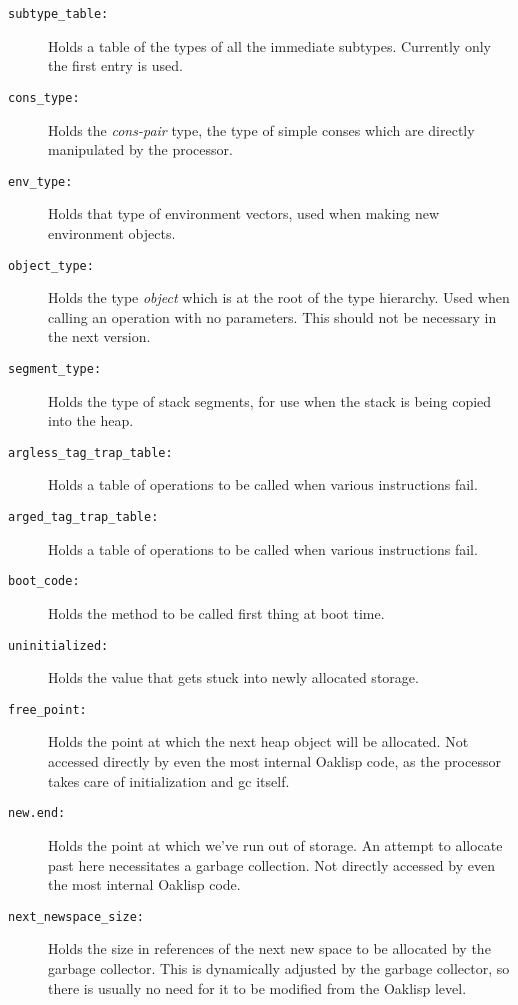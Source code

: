 \begin{description}
\item[\tt subtype\_table:] Holds a table of the types of all the immediate
subtypes.  Currently only the first entry is used.

\item[\tt cons\_type:] Holds the {\em cons-pair} type, the type of simple
conses which are directly manipulated by the processor.

\item[\tt env\_type:] Holds that type of environment vectors, used when
making new environment objects.

\item[\tt object\_type:] Holds the type {\em object} which is at the root
of the type hierarchy.  Used when calling an operation with no
parameters.  This should not be necessary in the next version.

\item[\tt segment\_type:] Holds the type of stack segments, for use when
the stack is being copied into the heap.

\item[\tt argless\_tag\_trap\_table:] Holds a table of operations to be
called when various instructions fail.

\item[\tt arged\_tag\_trap\_table:] Holds a table of operations to be
called when various instructions fail.

\item[\tt boot\_code:] Holds the method to be called first thing at boot time.

\item[\tt uninitialized:] Holds the value that gets stuck into newly
allocated storage.

\item[\tt free\_point:] Holds the point at which the next heap object will
be allocated.  Not accessed directly by even the most internal Oaklisp
code, as the processor takes care of initialization and gc itself.

\item[\tt new.end:] Holds the point at which we've run out of storage.  An
attempt to allocate past here necessitates a garbage collection.  Not
directly accessed by even the most internal Oaklisp code.

\item[\tt next\_newspace\_size:] Holds the size in references of the
next new space to be allocated by the garbage collector.  This is
dynamically adjusted by the garbage collector, so there is usually no
need for it to be modified from the Oaklisp level.

\end{description}




